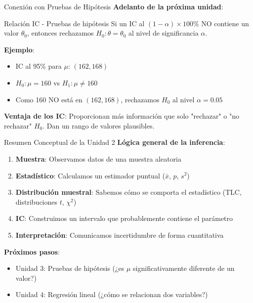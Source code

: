 \documentclass[aspectratio=169, 11pt]{beamer}
\begin{document}
\begin{frame}{Conexión con Pruebas de Hipótesis}
\textbf{Adelanto de la próxima unidad}:

\vspace{0.3cm}
\begin{block}{Relación IC - Pruebas de hipótesis}
Si un IC al $(1-\alpha) \times 100\%$ NO contiene un valor $\theta_0$, entonces rechazamos $H_0: \theta = \theta_0$ al nivel de significancia $\alpha$.
\end{block}

\vspace{0.3cm}
\textbf{Ejemplo}:
\begin{itemize}
  \item IC al 95\% para $\mu$: $(162, 168)$
  \item $H_0: \mu = 160$ vs $H_1: \mu \neq 160$
  \item Como 160 NO está en $(162, 168)$, rechazamos $H_0$ al nivel $\alpha = 0.05$
\end{itemize}

\vspace{0.3cm}
\textbf{Ventaja de los IC}: Proporcionan más información que solo "rechazar" o "no rechazar" $H_0$. Dan un rango de valores plausibles.
\end{frame}

\begin{frame}{Resumen Conceptual de la Unidad 2}
\textbf{Lógica general de la inferencia}:

\vspace{0.3cm}
\begin{enumerate}
  \item \textbf{Muestra}: Observamos datos de una muestra aleatoria
  \item \textbf{Estadístico}: Calculamos un estimador puntual ($\bar{x}$, $\hat{p}$, $s^2$)
  \item \textbf{Distribución muestral}: Sabemos cómo se comporta el estadístico (TLC, distribuciones $t$, $\chi^2$)
  \item \textbf{IC}: Construimos un intervalo que probablemente contiene el parámetro
  \item \textbf{Interpretación}: Comunicamos incertidumbre de forma cuantitativa
\end{enumerate}

\vspace{0.3cm}
\textbf{Próximos pasos}:
\begin{itemize}
  \item Unidad 3: Pruebas de hipótesis (¿es $\mu$ significativamente diferente de un valor?)
  \item Unidad 4: Regresión lineal (¿cómo se relacionan dos variables?)
\end{itemize}
\end{frame}
\end{document}
